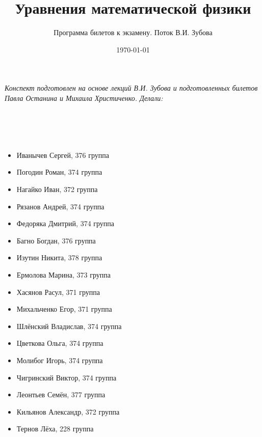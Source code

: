 \documentclass[12pt]{article}
\title{Уравнения математической физики}
\date{\today \currenttime}
\author{Программа билетов к экзамену. Поток В.И. Зубова}
\theoremstyle{plain}
\theoremstyle{definition}
\theoremstyle{remark}
\begin{document}
\maketitle

\emph{Конспект подготовлен на основе лекций В.И. Зубова и подготовленных билетов Павла Останина и Михаила Христиченко. Делали:} \\
\ \\
\ \\
\ \\
\ \\
\begin{minipage}{0.1\textwidth}
\end{minipage}
\begin{minipage}{1\textwidth}
\centering
    \begin{varwidth}{\textwidth}
      \begin{itemize}
          \item Иванычев Сергей, 376 группа
          \item Погодин Роман, 374 группа
          \item Нагайко Иван, 372 группа
          \item Рязанов Андрей, 374 группа
          \item Федоряка Дмитрий, 374 группа
          \item Багно Богдан, 376 группа
          \item Изутин Никита, 378 группа
          \item Ермолова Марина, 373 группа
          \item Хасянов Расул, 371 группа
          \item Михальченко Егор, 371 группа
          \item Шлёнский Владислав, 374 группа
          \item Цветкова Ольга, 374 группа
          \item Молибог Игорь, 374 группа
          \item Чигринский Виктор, 374 группа
          \item Леонтьев Семён, 377 группа
          \item Кильянов Александр, 372 группа \item Тернов Лёха, 228 группа
    \end{itemize}
  \end{varwidth}
\end{minipage}
\begin{minipage}{0.1\textwidth}
\end{minipage}
\newpage
\tableofcontents
\end{document}
